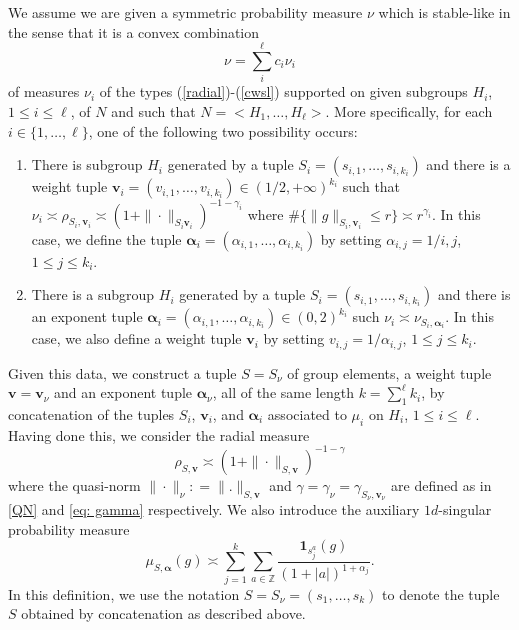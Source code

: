 \documentclass[pdflatex,sn-mathphys-num]{sn-jnl}%
\theoremstyle{thmstyleone}%
\theoremstyle{thmstyletwo}%
\theoremstyle{thmstylethree}%
\begin{document}
\label{sec: convex}
We assume we are given a symmetric probability measure $\nu$ which is stable-like in the sense that it is a convex combination
\begin{equation}\nu=\sum _i^\ell c_i\nu_i \label{nu-conv}\end{equation}
of measures $\nu_i$ of the types (\ref{radial})-(\ref{cwsl}) supported on  given subgroups $H_i$, $1\le i\le \ell$, of $N$ and such that $N=<H_1,\dots,H_\ell>$. More specifically, for each $i\in \{1,\dots,\ell\}$, one of the following two possibility occurs:
\begin{enumerate}
    \item There is subgroup $H_i$ generated by a tuple $S_i=(s_{i,1},\dots,s_{i,k_i}) $ and there is a weight tuple $\mathbf v_i=(v_{i,1},\dots,v_{i,k_i})\in (1/2,+\infty)^{k_i}$ such that $\nu_i\asymp \rho_{S_i,\mathbf v_i}\asymp (1+\|\cdot\|_{S_i\mathbf v_i})^{-1-\gamma_i}$ where 
    $\#\{\|g\|_{S_i,\mathbf v_i}\le r\}\asymp r^{\gamma_i}$.  In this case, we define the tuple $\bm{\alpha}_i=(\alpha_{i,1},\dots,\alpha_{i,k_i})$ by setting $\alpha_{i,j}=1/{i,j}$, $1\le j\le k_i$.
    \item There is a subgroup $H_i$ generated by a tuple $S_i=(s_{i,1},\dots,s_{i,k_i}) $ and there is an exponent tuple $\bm{\alpha}_i=(\alpha_{i,1},\dots,\alpha_{i,k_i})\in (0,2)^{k_i}$ such
    $\nu_i \asymp \nu_{S_i,\bm {\alpha}_i}.$ In this case, we also define a weight tuple $\mathbf v_i$ by setting $v_{i,j}=1/\alpha_{i,j}$, $1\le j\le k_i$.    \end{enumerate}


Given this data, we construct a tuple $S=S_\nu$ of group elements, a weight tuple $\mathbf v=\mathbf v_\nu$ and an exponent tuple $\bm{\alpha}_\nu$, all of the same length $k=\sum_1^\ell k_i$, by concatenation of the tuples $S_i$, $\mathbf v_i$, and $\bm{\alpha}_i$ associated to $\mu_i$ on $H_i$, $1\le i\le \ell$. 
Having done this, we consider the 
 radial measure 
$$\rho_{S,\mathbf v}\asymp(1+\|\cdot\|_{S,\mathbf v})^{-1-\gamma}$$
where the quasi-norm $\|\cdot\|_\nu : =\|.\|_{S,\mathbf v}$ and $\gamma=\gamma_{\nu}=\gamma_{S_\nu,\mathbf v_\nu}$ are defined as in \eqref{QN} and \eqref{eq: gamma} respectively.  We also introduce the auxiliary $1d$-singular probability measure 
\begin{equation}\label{muS}\mu_{S,\bm{\alpha}}(g) \asymp \sum_{j=1}^k \sum_{a\in \mathbb{Z}} \frac{\mathbf{1}_{ s_j^a}(g)}{(1+|a|)^{1+\alpha_j}}.\end{equation}
In this definition, we use the notation $S=S_\nu=(s_1,\dots,s_k)$ to denote the tuple $S$ obtained by concatenation as described above.
\end{document}
